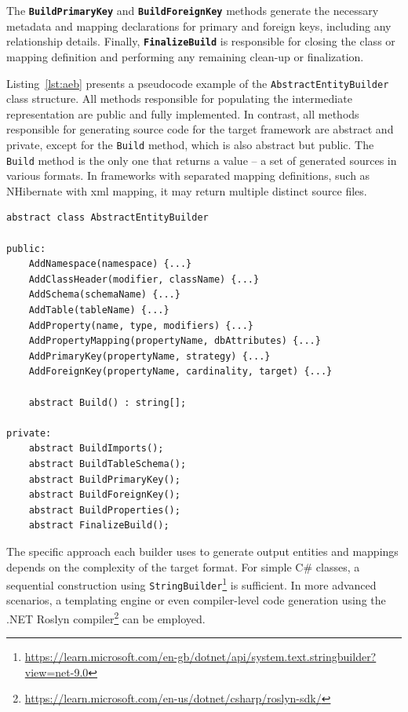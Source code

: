 The \texttt{\textbf{BuildPrimaryKey}} and \texttt{\textbf{BuildForeignKey}} methods generate the necessary metadata and mapping declarations for primary and foreign keys, including any relationship details.
Finally, \texttt{\textbf{FinalizeBuild}} is responsible for closing the class or mapping definition and performing any remaining clean-up or finalization.

Listing~\ref{lst:aeb} presents a pseudocode example of the \texttt{AbstractEntityBuilder} class structure. All methods responsible for populating the intermediate representation are public and fully implemented. In contrast, all methods responsible for generating source code for the target framework are abstract and private, except for the \texttt{Build} method, which is also abstract but public. The \texttt{Build} method is the only one that returns a value -- a set of generated sources in various formats. In frameworks with separated mapping definitions, such as NHibernate with \acrshort{xml} mapping, it may return multiple distinct source files. 

 \begin{lstlisting}[caption={AbstractEntityBuilder class structure}, language=pseudo, label={lst:aeb}]
abstract class AbstractEntityBuilder
    
public: 
    AddNamespace(namespace) {...}
    AddClassHeader(modifier, className) {...}
    AddSchema(schemaName) {...}
    AddTable(tableName) {...}
    AddProperty(name, type, modifiers) {...}
    AddPropertyMapping(propertyName, dbAttributes) {...}
    AddPrimaryKey(propertyName, strategy) {...}
    AddForeignKey(propertyName, cardinality, target) {...}
    
    abstract Build() : string[];

private: 
    abstract BuildImports();
    abstract BuildTableSchema();
    abstract BuildPrimaryKey();
    abstract BuildForeignKey();
    abstract BuildProperties();
    abstract FinalizeBuild();
 \end{lstlisting}

 The specific approach each builder uses to generate output entities and mappings depends on the complexity of the target format. For simple C\# classes, a sequential construction using \texttt{StringBuilder}\footnote{\url{https://learn.microsoft.com/en-gb/dotnet/api/system.text.stringbuilder?view=net-9.0}} is sufficient. In more advanced scenarios, a templating engine or even compiler-level code generation using the .NET Roslyn compiler\footnote{\url{https://learn.microsoft.com/en-us/dotnet/csharp/roslyn-sdk/}} can be employed.

